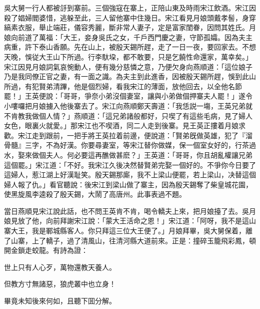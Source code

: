 吳大舅一行人都被㧱到寨前。三個強寇在寨上，正陪山東及時雨宋江飲酒。宋江因殺了娼婦閻婆惜，逃躲至此，三人留他寨中住幾日。宋江看見月娘頭戴孝髻，身穿縞素衣服，舉止端莊，儀容秀麗，斷非常人妻子，定是富家閨眷，因問其姓氏。月娘向前道了萬福：「大王，妾身吳氏之女，千戶西門慶之妻，守節孤孀。因為夫主病重，許下泰山香願。先在山上，被殷天錫所趕，走了一日一夜，要回家去。不想天晚，悞従大王山下所過。行李馱垜，都不敢要，只是乞饒性命還家，萬幸矣。」宋江因見月娘詞氣哀惋動人，便有幾分慈憐之意，乃便欠身向燕順道：「這位娘子乃是我同僚正官之妻，有一面之識。為夫主到此進香，因被殷天錫所趕，悞到此山所過，有犯賢弟清蹕，他是個烈婦，看我宋江的薄面，放他回去，以全他名節罷！」王英便說：「哥哥，爭奈小弟沒個妻室，讓與小弟做個押寨夫人罷！」遂令小嘍囉把月娘擄入他後寨去了。宋江向燕順鄭天壽道：「我恁説一塲，王英兄弟就不肯教我做個人情？」燕順道：「這兄弟諸般都好，只喫了有這些毛病，見了婦人女色，眼裏火就愛。」那宋江也不喫酒，同二人走到後寨。見王英正摟着月娘求歡。宋江走到跟前，一把手將王英拉着前邊，便說道：「賢弟旣做英雄，犯了『溜骨髓』三字，不為好漢。你要尋妻室，等宋江替你做媒，保一個室女好的，行茶過水，娶來做個夫人。何必要這再醮做甚麽？」王英道：「哥哥，你且胡亂權讓兄弟這個罷。」宋江道：「不好。我宋江久後决然替賢弟完娶一個好的。不爭你今日要了這婦人，惹江湖上好漢耻笑。殷天錫那廝，我不上梁山便罷，若上梁山，决替這個婦人報了仇。」看官聽說：後宋江到梁山做了寨主，因為殷天錫奪了柴皇城花園，使黑旋風李逵殺了殷天錫，大鬧了高唐州。此事表過不題。

當日燕順見宋江說此話，也不問王英肯不肯，喝令轎夫上來，把月娘擡了去。吳月娘見放了他，向前拜謝宋江說：「蒙大王活命之恩！」宋江道：「阿呀，我不是這山寨大王，我是鄆城縣客人。你只拜這三位大王便了。」月娘拜畢，吳大舅保着，離了山寨，上了轎子，過了清風山，往清河縣大道前來。正是：撞碎玉籠飛彩鳳，頓開金鎖走蛟龍。有詩為證：

\begin{myquote}
世上只有人心歹，萬物還教天養人。

但教方寸無諸惡，狼虎叢中也立身！
\end{myquote}

畢竟未知後來何如，且聽下囬分解。

